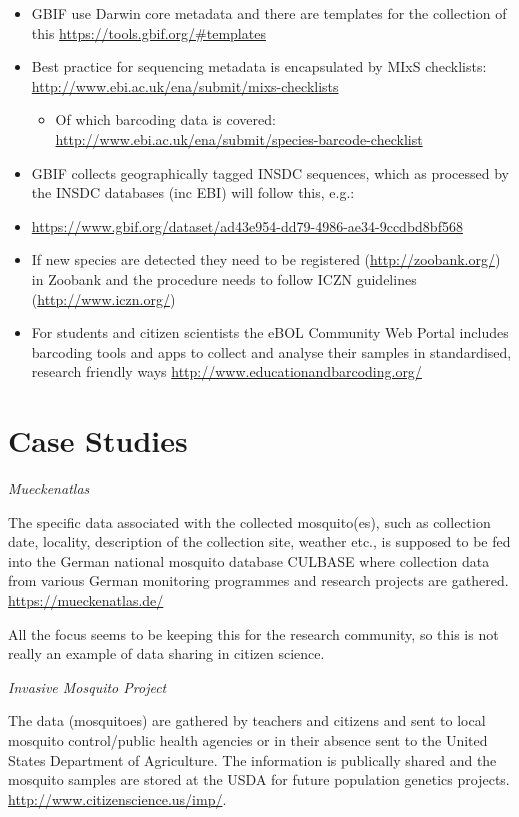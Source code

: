 \documentclass[
]{article}
\providecommand{\tightlist}{%
  \setlength{\itemsep}{0pt}\setlength{\parskip}{0pt}}
\begin{document}
\begin{itemize}
\tightlist
\item
  GBIF use Darwin core metadata and there are templates for the collection of this \url{https://tools.gbif.org/\#templates}
\item
  Best practice for sequencing metadata is encapsulated by MIxS checklists: \url{http://www.ebi.ac.uk/ena/submit/mixs-checklists}

  \begin{itemize}
  \tightlist
  \item
    Of which barcoding data is covered: \url{http://www.ebi.ac.uk/ena/submit/species-barcode-checklist}
  \end{itemize}
\item
  GBIF collects geographically tagged INSDC sequences, which as processed by the INSDC databases (inc EBI) will follow this, e.g.:
\item
  \url{https://www.gbif.org/dataset/ad43e954-dd79-4986-ae34-9ccdbd8bf568}
\item
  If new species are detected they need to be registered (\url{http://zoobank.org/}) in Zoobank and the procedure needs to follow ICZN guidelines (\url{http://www.iczn.org/})
\item
  For students and citizen scientists the eBOL Community Web Portal includes barcoding tools and apps to collect and analyse their samples in standardised, research friendly ways \url{http://www.educationandbarcoding.org/}
\end{itemize}

\hypertarget{case-studies}{%
\section{Case Studies}\label{case-studies}}

\emph{Mueckenatlas}

The specific data associated with the collected mosquito(es), such as collection date, locality, description of the collection site, weather etc., is supposed to be fed into the German national mosquito database CULBASE where collection data from various German monitoring programmes and research projects are gathered.
\url{https://mueckenatlas.de/}

All the focus seems to be keeping this for the research community, so this is not really an example of data sharing in citizen science.

\emph{Invasive Mosquito Project}

The data (mosquitoes) are gathered by teachers and citizens and sent to local mosquito control/public health agencies or in their absence sent to the United States Department of Agriculture. The information is publically shared and the mosquito samples are stored at the USDA for future population genetics projects. \url{http://www.citizenscience.us/imp/}.
\end{document}
